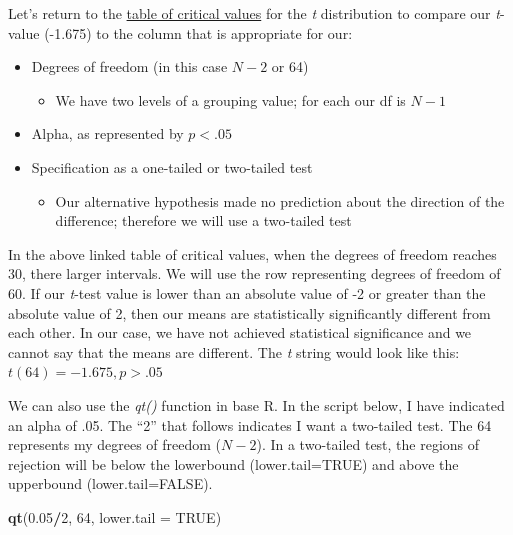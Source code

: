 \documentclass[
  11pt,
]{book}
\newenvironment{Shaded}{\begin{snugshade}}{\end{snugshade}}
\newcommand{\AttributeTok}[1]{\textcolor[rgb]{0.27,0.27,0.27}{#1}}
\newcommand{\ConstantTok}[1]{\textcolor[rgb]{0.37,0.37,0.37}{#1}}
\newcommand{\DecValTok}[1]{\textcolor[rgb]{0.06,0.06,0.06}{#1}}
\newcommand{\FloatTok}[1]{\textcolor[rgb]{0.06,0.06,0.06}{#1}}
\newcommand{\FunctionTok}[1]{\textcolor[rgb]{0.27,0.27,0.27}{\textbf{#1}}}
\newcommand{\NormalTok}[1]{#1}
\newcommand{\SpecialCharTok}[1]{\textcolor[rgb]{0.43,0.43,0.43}{\textbf{#1}}}
\providecommand{\tightlist}{%
  \setlength{\itemsep}{0pt}\setlength{\parskip}{0pt}}
\begin{document}
Let's return to the \href{https://www.statology.org/t-distribution-table/}{table of critical values} for the \emph{t} distribution to compare our \emph{t}-value (-1.675) to the column that is appropriate for our:

\begin{itemize}
\tightlist
\item
  Degrees of freedom (in this case \(N-2\) or 64)

  \begin{itemize}
  \tightlist
  \item
    We have two levels of a grouping value; for each our df is \(N-1\)
  \end{itemize}
\item
  Alpha, as represented by \(p < .05\)
\item
  Specification as a one-tailed or two-tailed test

  \begin{itemize}
  \tightlist
  \item
    Our alternative hypothesis made no prediction about the direction of the difference; therefore we will use a two-tailed test
  \end{itemize}
\end{itemize}

In the above linked table of critical values, when the degrees of freedom reaches 30, there larger intervals. We will use the row representing degrees of freedom of 60. If our \emph{t}-test value is lower than an absolute value of -2 or greater than the absolute value of 2, then our means are statistically significantly different from each other. In our case, we have not achieved statistical significance and we cannot say that the means are different. The \emph{t} string would look like this: \(t(64) = -1.675, p > .05\)

We can also use the \emph{qt()} function in base R. In the script below, I have indicated an alpha of .05. The ``2'' that follows indicates I want a two-tailed test. The 64 represents my degrees of freedom (\(N-2\)). In a two-tailed test, the regions of rejection will be below the lowerbound (lower.tail=TRUE) and above the upperbound (lower.tail=FALSE).

\begin{Shaded}
\begin{Highlighting}[]
\FunctionTok{qt}\NormalTok{(}\FloatTok{0.05}\SpecialCharTok{/}\DecValTok{2}\NormalTok{, }\DecValTok{64}\NormalTok{, }\AttributeTok{lower.tail =} \ConstantTok{TRUE}\NormalTok{)}
\end{Highlighting}
\end{Shaded}
\end{document}
